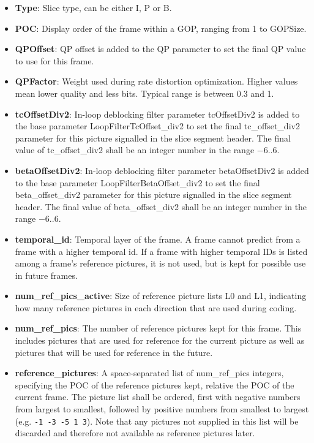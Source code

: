 \documentclass[a4paper,11pt]{jctvcdoc}
\begin{document}
\begin{itemize}
\item[]\textbf{Type}: Slice type, can be either I, P or B.

\item[]\textbf{POC}: Display order of the frame within a GOP, ranging
from 1 to GOPSize.

\item[]\textbf{QPOffset}: QP offset is added to the QP parameter to set
the final QP value to use for this frame.

\item[]\textbf{QPFactor}: Weight used during rate distortion
optimization. Higher values mean lower quality and less bits. Typical
range is between
0.3 and 1.

\item[]\textbf{tcOffsetDiv2}: In-loop deblocking filter parameter tcOffsetDiv2 
is added to the base parameter LoopFilterTcOffset_div2 to set the final tc_offset_div2 
parameter for this picture signalled in the slice segment header. The final 
value of tc_offset_div2 shall be an integer number in the range $-6..6$.

\item[]\textbf{betaOffsetDiv2}: In-loop deblocking filter parameter betaOffsetDiv2 
is added to the base parameter LoopFilterBetaOffset_div2 to set the final beta_offset_div2 
parameter for this picture signalled in the slice segment header. The final 
value of beta_offset_div2 shall be an integer number in the range $-6..6$.

\item[]\textbf{temporal_id}: Temporal layer of the frame. A frame cannot
predict from a frame with a higher temporal id. If a frame with higher
temporal IDs is listed among a frame's reference pictures, it is
not used, but is kept for possible use in future frames.

\item[]\textbf{num_ref_pics_active}: Size of reference picture lists L0
and L1, indicating how many reference pictures in each direction that
are used during coding.

\item[]\textbf{num_ref_pics}: The number of reference pictures kept for
this frame.  This includes pictures that are used for reference for the
current picture as well as pictures that will be used for reference in
the future.

\item[]\textbf{reference_pictures}: A space-separated list of
num_ref_pics integers, specifying the POC of the reference pictures
kept, relative the POC of the current frame. The picture list shall be
ordered, first with negative numbers from largest to smallest, followed
by positive numbers from smallest to largest (e.g. \verb|-1 -3 -5 1 3|).
Note that any pictures not supplied in this list will be discarded and
therefore not available as reference pictures later.


\end{itemize}
\end{document}
